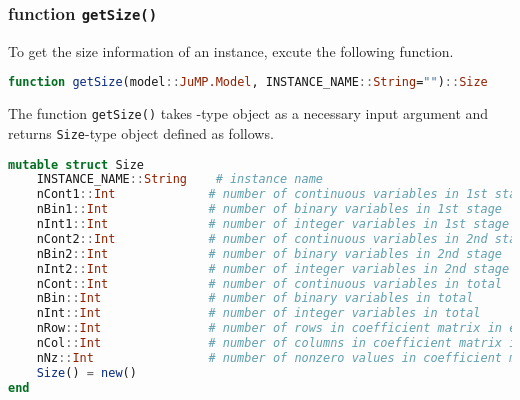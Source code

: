 
\subsubsection{function \texttt{getSize()}}
To get the size information of an instance, excute the following function.
\begin{lstlisting}[frame=single,language=julia]
function getSize(model::JuMP.Model, INSTANCE_NAME::String="")::Size
\end{lstlisting}
The function \texttt{getSize()} takes \jumpmodel-type object as a necessary input argument and returns \texttt{Size}-type object defined as follows.
\begin{lstlisting}[frame=single,language=julia]
mutable struct Size
	INSTANCE_NAME::String    # instance name
	nCont1::Int             # number of continuous variables in 1st stage
	nBin1::Int              # number of binary variables in 1st stage
	nInt1::Int              # number of integer variables in 1st stage
	nCont2::Int             # number of continuous variables in 2nd stage    
	nBin2::Int              # number of binary variables in 2nd stage
	nInt2::Int              # number of integer variables in 2nd stage    
	nCont::Int              # number of continuous variables in total      
	nBin::Int               # number of binary variables in total      
	nInt::Int               # number of integer variables in total      
	nRow::Int               # number of rows in coefficient matrix in extensive form
	nCol::Int               # number of columns in coefficient matrix in extensive form
	nNz::Int                # number of nonzero values in coefficient matrix in extensive form
	Size() = new()
end
\end{lstlisting}

